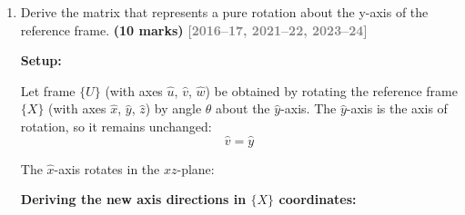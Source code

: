 \documentclass[12pt,a3paper]{article}
\newcommand{\yr}[1]{\hfill\textcolor{gray}{\small\textbf{[#1]}}}
\newcommand{\mk}[1]{\textcolor{orange!70!black}{\small\textbf{(#1 marks)}}}
\begin{document}
\begin{enumerate}
\begin{tcolorbox}[enhanced,breakable,ansbox,colback=cB!4,colframe=cB,
  boxrule=0.8pt,arc=5pt,
  title={\textbf{Solution}},fonttitle=\bfseries\color{white},
  colbacktitle=cB]
\medskip
\textbf{Result:}
\[
  \boxed{B_{\text{new}} =
  \begin{pmatrix}0&-1&0&1\\0&0&-1&6\\1&0&0&4\\0&0&0&1\end{pmatrix}}
\]

The new position of the origin is $(1,\ 6,\ 4)$ and the orientation
is given by the upper-left $3\times3$ sub-matrix.

\end{tcolorbox}
\item \label{qlabel:C2-Q3}
Derive the matrix that represents a pure rotation about the y-axis of
the reference frame. \mk{10}
\yr{2016--17, 2021--22, 2023--24}

\begin{tcolorbox}[enhanced,breakable,ansbox,colback=cB!4,colframe=cB,
  boxrule=0.8pt,arc=5pt,
  title={\textbf{Answer}},fonttitle=\bfseries\color{white},
  colbacktitle=cB]

\textbf{Setup:}

Let frame $\{U\}$ (with axes $\hat{u}$, $\hat{v}$, $\hat{w}$) be
obtained by rotating the reference frame $\{X\}$ (with axes
$\hat{x}$, $\hat{y}$, $\hat{z}$) by angle $\theta$ about the
$\hat{y}$-axis. The $\hat{y}$-axis is the axis of rotation, so it
remains unchanged:
\[
  \hat{v} = \hat{y}
\]

The $\hat{x}$-axis rotates in the $xz$-plane:

\begin{center}
\end{center}

\textbf{Deriving the new axis directions in $\{X\}$ coordinates:}


\end{tcolorbox}
\end{enumerate}
\end{document}
